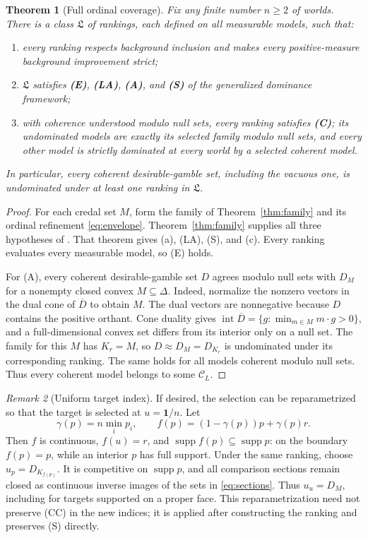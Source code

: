 \documentclass[11pt]{article}
\newtheorem{theorem}{Theorem}
\theoremstyle{remark}
\newtheorem{remark}[theorem]{Remark}
\newcommand{\one}{\mathbf 1}
\newcommand{\supp}{\operatorname{supp}}
\begin{document}
\begin{theorem}[Full ordinal coverage]\label{thm:coverage}
Fix any finite number $n\ge2$ of worlds. There is a class $\mathfrak L$ of
rankings, each defined on all measurable models, such that:
\begin{enumerate}[label=(\alph*)]
\item every ranking respects background inclusion and makes every
positive-measure background improvement strict;
\item $\mathfrak L$ satisfies \textbf{(E)}, \textbf{(LA)}, \textbf{(A)}, and
\textbf{(S)} of the generalized dominance framework;
\item with coherence understood modulo null sets, every ranking satisfies
\textbf{(C)}; its undominated models are exactly its selected family modulo
null sets, and every other model is strictly dominated at every world by a
selected coherent model.
\end{enumerate}
In particular, every coherent desirable-gamble set, including the vacuous one,
is undominated under at least one ranking in $\mathfrak L$.
\end{theorem}
\begin{proof}
For each credal set $M$, form the family of Theorem~\ref{thm:family} and its
ordinal refinement \eqref{eq:envelope}. Theorem~\ref{thm:family} supplies all
three hypotheses of \cite[Theorem~4]{OR}. That theorem gives (a), (LA), (S),
and (c). Every ranking evaluates every measurable model, so (E) holds.

For (A), every coherent desirable-gamble set $D$ agrees modulo null sets with
$D_M$ for a nonempty closed convex $M\subseteq\Delta$. Indeed, normalize the
nonzero vectors in the dual cone of $\overline D$ to obtain $M$. The dual
vectors are nonnegative because $D$ contains the positive orthant. Cone
duality gives
$\operatorname{int}\overline D=\{g:\min_{m\in M}m\cdot g>0\}$, and a
full-dimensional convex set differs from its interior only on a null set.
The family for this $M$ has $K_r=M$, so $D\approx D_M=D_{K_r}$ is undominated
under its corresponding ranking. The same holds for all models coherent
modulo null sets. Thus every coherent model belongs to some $\mathcal C_L$.
\end{proof}

\begin{remark}[Uniform target index]
If desired, the selection can be reparametrized so that the target is selected
at $u=\one/n$. Let
\[
 \gamma(p)=n\min_i p_i,\qquad
 f(p)=(1-\gamma(p))p+\gamma(p)r.
\]
Then $f$ is continuous, $f(u)=r$, and $\supp f(p)\subseteq\supp p$: on the
boundary $f(p)=p$, while an interior $p$ has full support. Under the same
ranking, choose $u_p=D_{K_{f(p)}}$. It is competitive on $\supp p$, and all
comparison sections remain closed as continuous inverse images of the sets
in \eqref{eq:sections}. Thus $u_u=D_M$, including for targets supported on a
proper face. This reparametrization need not preserve (CC) in the new indices;
it is applied after constructing the ranking and preserves (S) directly.
\end{remark}
\end{document}
